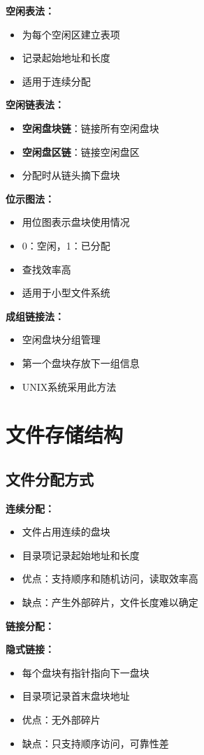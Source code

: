 \documentclass[lang=cn,newtx,10pt,scheme=chinese]{../../elegantbook}
\begin{document}
\textbf{空闲表法：}
\begin{itemize}
  \item 为每个空闲区建立表项
  \item 记录起始地址和长度
  \item 适用于连续分配
\end{itemize}

\textbf{空闲链表法：}
\begin{itemize}
  \item \textbf{空闲盘块链}：链接所有空闲盘块
  \item \textbf{空闲盘区链}：链接空闲盘区
  \item 分配时从链头摘下盘块
\end{itemize}

\textbf{位示图法：}
\begin{itemize}
  \item 用位图表示盘块使用情况
  \item 0：空闲，1：已分配
  \item 查找效率高
  \item 适用于小型文件系统
\end{itemize}

\textbf{成组链接法：}
\begin{itemize}
  \item 空闲盘块分组管理
  \item 第一个盘块存放下一组信息
  \item UNIX系统采用此方法
\end{itemize}

\section{文件存储结构}

\subsection{文件分配方式}

\textbf{连续分配：}
\begin{itemize}
  \item 文件占用连续的盘块
  \item 目录项记录起始地址和长度
  \item 优点：支持顺序和随机访问，读取效率高
  \item 缺点：产生外部碎片，文件长度难以确定
\end{itemize}

\textbf{链接分配：}

\textbf{隐式链接：}
\begin{itemize}
  \item 每个盘块有指针指向下一盘块
  \item 目录项记录首末盘块地址
  \item 优点：无外部碎片
  \item 缺点：只支持顺序访问，可靠性差
\end{itemize}
\end{document}
